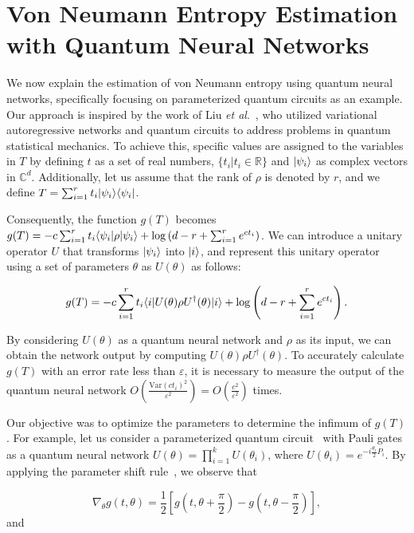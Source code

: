 \documentclass[aps,groupedaddress,superscriptaddress,amssymb,amsmath,amsbsy,amsfonts,twocolumn,pra]{revtex4}
\begin{document}
\section{Von Neumann Entropy Estimation with Quantum Neural Networks} \label{sec:MAIN}
We now explain the estimation of von Neumann entropy using quantum neural networks, specifically focusing on parameterized quantum circuits as an example. Our approach is inspired by the work of Liu \emph{et al}.~\cite{LMZW21}, who utilized variational autoregressive networks and quantum circuits to address problems in quantum statistical mechanics. To achieve this, specific values are assigned to the variables in $T$ by defining $t$ as a set of real numbers, $\{t_i | t_i \in \mathbb{R}\}$ and $|\psi_i\rangle$ as complex vectors in $\mathbb{C}^d$. Additionally, let us assume that the rank of $\rho$ is denoted by $r$, and we define $T = \sum^r_{i=1} t_i |\psi_i\rangle\langle\psi_i|$.

Consequently, the function $g(T)$ becomes $g(T) = -c\sum^r_{i=1} t_i \langle\psi_i|\rho|\psi_i\rangle + \log\left(d-r+\sum^r_{i=1} e^{ct_i}\right)$. We can introduce a unitary operator $U$ that transforms $|\psi_i\rangle$ into $|i\rangle$, and represent this unitary operator using a set of parameters $\theta$ as $U(\theta)$ as follows:

\begin{equation}
g(T) = -c\sum^r_{i=1} t_i \langle i|U(\theta)\rho U^{\dagger}(\theta)|i\rangle + \log\left(d-r+\sum^r_{i=1} e^{ct_i}\right).
\end{equation}

By considering $U(\theta)$ as a quantum neural network and $\rho$ as its input, we can obtain the network output by computing $U(\theta)\rho U^{\dagger}(\theta)$. To accurately calculate $g(T)$ with an error rate less than $\varepsilon$, it is necessary to measure the output of the quantum neural network $O\left(\frac{\text{Var}({ct_i})^2}{\varepsilon^{2}}\right) = O\left(\frac{c^2}{\varepsilon^{2}}\right)$ times.

Our objective was to optimize the parameters to determine the infimum of $g(T)$. For example, let us consider a parameterized quantum circuit~\cite{BLSF19} with Pauli gates as a quantum neural network $U(\theta) = \prod^k_{i=1} U(\theta_i)$, where $U(\theta_i) = e^{-i\frac{\theta_i}{2}P_i}$. By applying the parameter shift rule~\cite{MNKF18}, we observe that

\begin{equation}
\nabla_{\theta}g(t, \theta) = \frac{1}{2}\left[g\left(t, \theta+\frac{\pi}{2}\right)-g\left(t, \theta-\frac{\pi}{2}\right)\right],
\end{equation}
and
\end{document}
